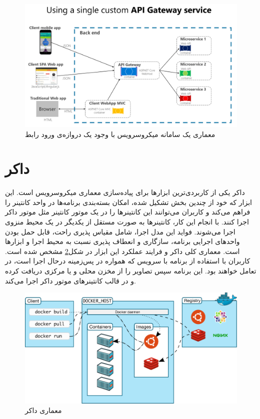 \begin{figure}[h]
	\vspace{1cm}
	\centering
	\includegraphics[scale=0.5]{figures/custom-service-api-gateway.png}
	\caption{معماری یک سامانه میکروسرویس با وجود یک ‌دروازه‌ی ورود رابط\cite{Microsoft_API_Gateway_2023}}
	\label{fig:api-gateway}
\end{figure}

\section{داکر}
داکر یکی از کاربردی‌ترین ابزار‌ها برای پیاده‌سازی معماری میکروسرویس است. این ابزار که خود از چندین بخش تشکیل شده، امکان بسته‌بندی برنامه‌ها در واحد کانتینر را فراهم می‌کند و کاربران می‌توانند این کانتینر‌ها را در یک موتور کانتینر مثل موتور داکر اجرا کنند. با انجام این کار، کانتینرها به صورت مستقل از یکدیگر در یک محیط منزوی اجرا می‌شوند. فواید این مدل اجرا، شامل مقیاس پذیری راحت، قابل حمل بودن واحد‌های اجرایی برنامه، سازگاری و انعطاف پذیری نسبت به محیط اجرا و ابزار‌ها است. معماری کلی داکر و فرایند عملکرد این ابزار در شکل\ref{fig:docker-arch} مشخص شده است. کاربران با استفاده از برنامه  
با سرویس  که همواره در پس‌زمینه در‌حال اجرا است، در تعامل‌ خواهند بود. این برنامه سپس تصاویر را از مخزن محلی و یا مرکزی دریافت کرده و در قالب کانتینرهای موتور داکر اجرا‌ می‌کند.
\begin{figure}[h]
	\vspace{1cm}
	\centering
	\includegraphics[scale=0.4]{figures/docker-architecture.png}
	\caption{معماری داکر}
	\label{fig:docker-arch}
\end{figure}

